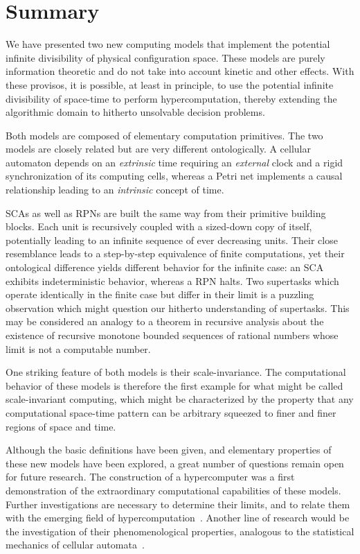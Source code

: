 \documentclass[pre,amssymb,showpacs,showkeys,preprint]{revtex4}
\begin{document}
\section{Summary}

We have presented two new computing models that implement the potential
infinite divisibility of physical configuration space.
These models are purely information theoretic and
do not take into account kinetic and other
effects.
With these provisos, it is possible, at least in
principle, to use the potential infinite
divisibility of space-time to perform hypercomputation,
thereby extending the algorithmic domain to hitherto unsolvable decision problems.

Both models are composed of elementary computation primitives.
The two models are closely related but are very different ontologically.
A cellular automaton depends on an {\em extrinsic} time requiring an {\em external} clock
and a rigid synchronization of its computing cells, whereas
a Petri net implements a causal relationship leading to an {\em intrinsic} concept of time.

SCAs as well as RPNs are built the same way from their primitive building blocks.
Each unit is recursively coupled with a sized-down copy of itself, potentially leading
to an infinite sequence of ever decreasing units.
Their close resemblance leads to a step-by-step equivalence of finite computations,
yet their ontological difference yields different behavior for the infinite case:
an SCA exhibits indeterministic behavior, whereas a RPN halts.
Two supertasks which operate identically in the finite case but differ in
their limit is a puzzling observation which might question our hitherto understanding of supertasks.
This may be considered an analogy to a theorem \cite{Specker49} in recursive analysis
about the existence of recursive monotone bounded sequences of rational numbers
whose limit is not a computable number.

One striking feature of both models is their scale-invariance.
The computational behavior of these models is therefore the first example for what might be called
scale-invariant computing, which might be characterized by the property that
any computational space-time pattern can be arbitrary squeezed to finer and finer regions of space and time.

Although the basic definitions have been given, and elementary properties of these new models have been explored,
a great number of questions remain open for future research.
The construction of a hypercomputer was a first demonstration of the
extraordinary computational capabilities of these models.
Further investigations are necessary to determine their limits, and to relate them with the
emerging field of hypercomputation~\cite{2002-cal-pav,ord-2002,Davis-2004,Doria-2006,Davis-2006}.
Another line of research would be the investigation of their phenomenological properties, analogous
to the statistical mechanics of cellular automata~\cite{wolfram83,wolfram-2002}.
\end{document}
